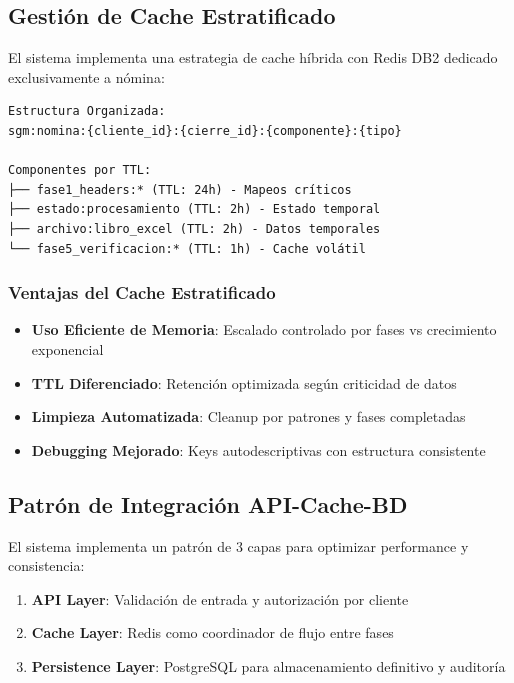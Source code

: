 \subsection{Gestión de Cache Estratificado}

El sistema implementa una estrategia de cache híbrida con Redis DB2 dedicado exclusivamente a nómina:

\begin{verbatim}
Estructura Organizada:
sgm:nomina:{cliente_id}:{cierre_id}:{componente}:{tipo}

Componentes por TTL:
├── fase1_headers:* (TTL: 24h) - Mapeos críticos
├── estado:procesamiento (TTL: 2h) - Estado temporal  
├── archivo:libro_excel (TTL: 2h) - Datos temporales
└── fase5_verificacion:* (TTL: 1h) - Cache volátil
\end{verbatim}

\subsubsection{Ventajas del Cache Estratificado}
\begin{itemize}
    \item \textbf{Uso Eficiente de Memoria}: Escalado controlado por fases vs crecimiento exponencial
    \item \textbf{TTL Diferenciado}: Retención optimizada según criticidad de datos
    \item \textbf{Limpieza Automatizada}: Cleanup por patrones y fases completadas
    \item \textbf{Debugging Mejorado}: Keys autodescriptivas con estructura consistente
\end{itemize}

\subsection{Patrón de Integración API-Cache-BD}

El sistema implementa un patrón de 3 capas para optimizar performance y consistencia:

\begin{enumerate}
    \item \textbf{API Layer}: Validación de entrada y autorización por cliente
    \item \textbf{Cache Layer}: Redis como coordinador de flujo entre fases
    \item \textbf{Persistence Layer}: PostgreSQL para almacenamiento definitivo y auditoría
\end{enumerate}

